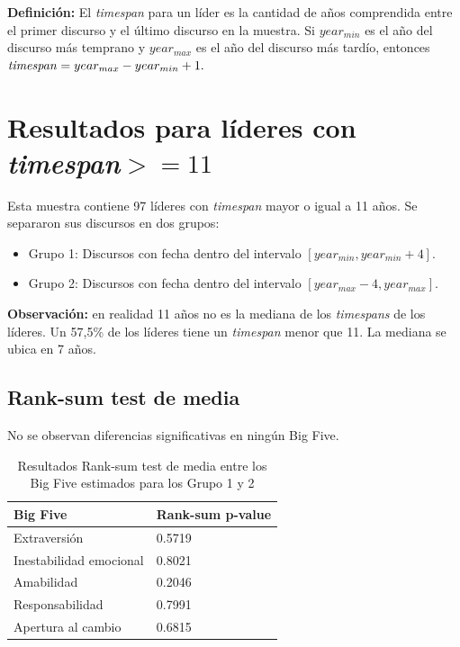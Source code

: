 \documentclass[12pt]{article}%
\begin{document}
\textbf{Definición:} El \textit{timespan} para un líder es la cantidad de años comprendida entre el primer discurso y el último discurso en la muestra. Si $year_{min}$ es el año del discurso más temprano y $year_{max}$ es el año del discurso más tardío, entonces $\text{\textit{timespan}}=year_{max}-year_{min}+1.$
	
\section{Resultados para líderes con \textit{timespan}$>=11$}
Esta muestra contiene 97 líderes con \textit{timespan} mayor o igual a 11 años. Se separaron sus discursos en dos grupos:
\begin{itemize}
	\item Grupo 1: Discursos con fecha dentro del intervalo $[year_{min},year_{min}+4].$
	\item Grupo 2: Discursos con fecha dentro del intervalo $[year_{max}-4,year_{max}].$
\end{itemize}

\textbf{Observación:} en realidad 11 años no es la mediana de los \textit{timespans} de los líderes. Un 57,5\% de los líderes tiene un \textit{timespan} menor que 11. La mediana se ubica en 7 años.


\subsection{Rank-sum test de media}
No se observan diferencias significativas en ningún Big Five.
\begin{table}[htpb]
	\centering
	\caption{Resultados Rank-sum test de media entre los Big Five estimados para los Grupo 1 y 2}
	\label{my-label}
	\begin{tabular}{ll}
		\toprule\toprule
		Big Five                & Rank-sum p-value \\
		\midrule
		Extraversión            & 0.5719           \\
		Inestabilidad emocional & 0.8021           \\
		Amabilidad              & 0.2046           \\
		Responsabilidad         & 0.7991           \\
		Apertura al cambio      & 0.6815   \\
		\bottomrule \bottomrule   
	\end{tabular}
\end{table}
\end{document}
